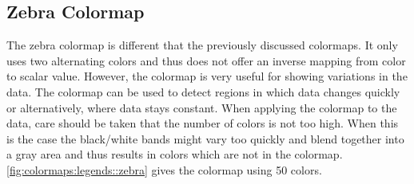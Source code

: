 \subsection{Zebra Colormap} %
\label{sub:zebra_colormap}
The zebra colormap is different that the previously discussed colormaps. It only uses two alternating colors and thus does not offer an inverse mapping from color to scalar value. However, the colormap is very useful for showing variations in the data. The colormap can be used to detect regions in which data changes quickly or alternatively, where data stays constant. When applying the colormap to the data, care should be taken that the number of colors is not too high. When this is the case the black/white bands might vary too quickly and blend together into a gray area and thus results in colors which are not in the colormap. \cref{fig:colormaps:legends::zebra} gives the colormap using 50 colors.